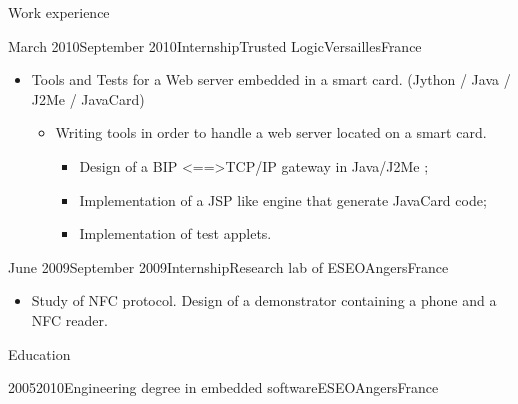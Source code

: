 \documentclass[a4paper, 10pt]{article}
\begin{document}
\begin{section} {Work experience}
    \begin{unbreakableExperience}{March 2010}{September 2010}{Internship}{Trusted Logic}{Versailles}{France}
	\begin{subexperience}
	    \begin{itemize}[parsep=0cm,itemsep=0cm,topsep=0cm]
		\item Tools and Tests for a Web server embedded in a smart card. (Jython / Java / J2Me / JavaCard)
		    \begin{itemize}[parsep=0cm,itemsep=0cm,topsep=0cm]
			\item Writing tools in order to handle a web server located on a smart card.
			    \begin{itemize}[parsep=0cm,itemsep=0cm,topsep=0cm]
				\item Design of a BIP \textless==\textgreater TCP/IP gateway in Java/J2Me ;
				\item Implementation of a JSP like engine that generate JavaCard code;
				\item Implementation of test applets.
			    \end{itemize}
		    \end{itemize}
	    \end{itemize}
	\end{subexperience}
    \end{unbreakableExperience}

    \begin{unbreakableExperience}{June 2009}{September 2009}{Internship}{Research lab of ESEO}{Angers}{France}
	\begin{subexperience}
	    \begin{itemize}[parsep=0cm,itemsep=0cm,topsep=0cm]
		\item Study of NFC protocol. Design of a demonstrator containing a phone and a NFC reader.
	    \end{itemize}
	\end{subexperience}
    \end{unbreakableExperience}
\end{section}

\begin{unbreakableSection} {Education}
    \begin{education}{2005}{2010}{Engineering degree in embedded software}{ESEO}{Angers}{France}
    \end{education}
\end{unbreakableSection}
\end{document}
